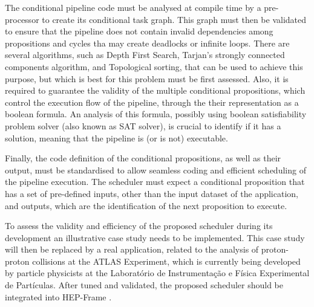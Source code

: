 
The conditional pipeline code must be analysed at compile time by a pre-processor to create its conditional task graph.
This graph must then be validated to ensure that the pipeline does not contain invalid dependencies among propositions and cycles tha may create deadlocks or infinite loops.
There are several algorithms, such as Depth First Search, Tarjan's strongly connected components algorithm, and Topological sorting, that can be used to achieve this purpose, but which is best for this problem must be first assessed.
Also, it is required to guarantee the validity of the multiple conditional propositions, which control the execution flow of the pipeline, through the their representation as a boolean formula.
An analysis of this formula, possibly using boolean satisfiability problem solver (also known as SAT solver), is crucial to identify if it has a solution, meaning that the pipeline is (or is not) executable.

Finally, the code definition of the conditional propositions, as well as their output, must be standardised to allow seamless coding and efficient scheduling of the pipeline execution.
The scheduler must expect a conditional proposition that has a set of pre-defined inputs, other than the input dataset of the application, and outputs, which are the identification of the next proposition to execute.

To assess the validity and efficiency of the proposed scheduler during its development an illustrative case study needs to be implemented.
This case study will then be replaced by a real application, related to the analysis of proton-proton collisions at the ATLAS Experiment, which is currently being developed by particle physicists at the Laboratório de Instrumentação e Física Experimental de Partículas.
After tuned and validated, the proposed scheduler should be integrated into HEP-Frame .





